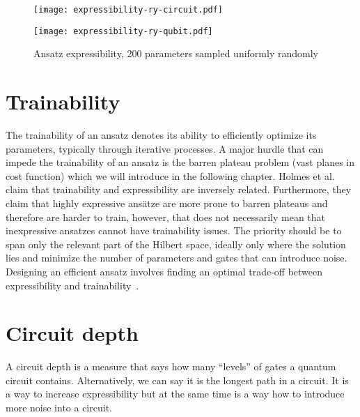 \begin{figure}[H]
    \centering
    \begin{minipage}{0.4\linewidth}
        \centering
        \texttt{[image: expressibility-ry-circuit.pdf]}
    \end{minipage}
    \begin{minipage}{0.4\linewidth}
        \centering
        \texttt{[image: expressibility-ry-qubit.pdf]}
    \end{minipage}
    \caption{Ansatz expressibility, 200 parameters sampled uniformly randomly}
\end{figure}

\section{Trainability}
The trainability of an ansatz denotes its ability to efficiently optimize its parameters, typically through iterative processes. A major hurdle that can impede the trainability of an ansatz is the barren plateau problem (vast planes in cost function) which we will introduce in the following chapter. Holmes et al.~\cite{holmes2022} claim that trainability and expressibility are inversely related. Furthermore, they claim that highly expressive ansätze are more prone to barren plateaus and therefore are harder to train, however, that does not necessarily mean that inexpressive ansatzes cannot have trainability issues. The priority should be to span only the relevant part of the Hilbert space, ideally only where the solution lies and minimize the number of parameters and gates that can introduce noise. Designing an efficient ansatz involves finding an optimal trade-off between expressibility and trainability~\cite{holmes2022}.


\section{Circuit depth}
A circuit depth is a measure that says how many ``levels'' of gates a quantum circuit contains. Alternatively, we can say it is the longest path in a circuit. It is a way to increase expressibility but at the same time is a way how to introduce more noise into a circuit.

